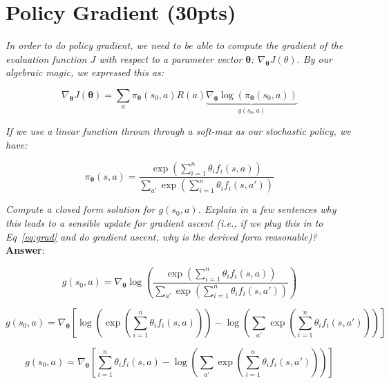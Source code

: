 \documentclass[fleqn]{hw5}
\begin{document}
\newpage

\section{Policy Gradient (30pts)}

\textit{In order to do policy gradient, we need to be able
to compute the gradient of the evaluation function $J$ with respect
to a parameter vector ${\mathbf \theta}$: $\nabla_{\mathbf \theta} J(\theta)$.  By
our algebraic magic, we expressed this as:}

\begin{equation} \label{eq:grad}
\nabla_{\mathbf \theta} J(\mathbf \theta) 
  = \sum_a \pi_{\mathbf \theta}(s_0,a) R(a) 
             \underbrace{\nabla_{\mathbf \theta} \log \left( \pi_{\mathbf \theta}(s_0,a) \right)}_{g(s_0,a)}
\end{equation}

\textit{If we use a linear function thrown through a soft-max as our stochastic policy, we have:}

\begin{equation}
\pi_{\mathbf \theta}(s,a) 
  = \frac {\exp \left( \sum_{i=1}^n \theta_i f_i(s,a) \right)}
          {\sum_{a'} \exp \left( \sum_{i=1}^n \theta_i f_i(s,a') \right)}
\end{equation}

\textit{Compute a closed form solution for $g(s_0,a)$.  Explain in a few
sentences \emph{why} this leads to a sensible update for gradient
ascent (i.e., if we plug this in to Eq~\eqref{eq:grad} and do gradient
ascent, why is the derived form reasonable)?}\\
\textbf{Answer}:

\begin{equation}
g(s_0,a) = \nabla_{\mathbf \theta} \log \left( \frac {\exp \left( \sum_{i=1}^n \theta_i f_i(s,a) \right)}
{\sum_{a'} \exp \left( \sum_{i=1}^n \theta_i f_i(s,a') \right)} \right)
\end{equation}

\begin{equation}
g(s_0,a) = \nabla_{\mathbf \theta} \left[ \log \left( \exp \left( \sum_{i=1}^n \theta_i f_i(s,a) \right) \right)
-\log \left( \sum_{a'} \exp \left( \sum_{i=1}^n \theta_i f_i(s,a') \right) \right) \right]
\end{equation}

\begin{equation}
g(s_0,a) = \nabla_{\mathbf \theta} \left[  \sum_{i=1}^n \theta_i f_i(s,a)
-\log \left( \sum_{a'} \exp \left( \sum_{i=1}^n \theta_i f_i(s,a') \right) \right) \right]
\end{equation}
\end{document}
